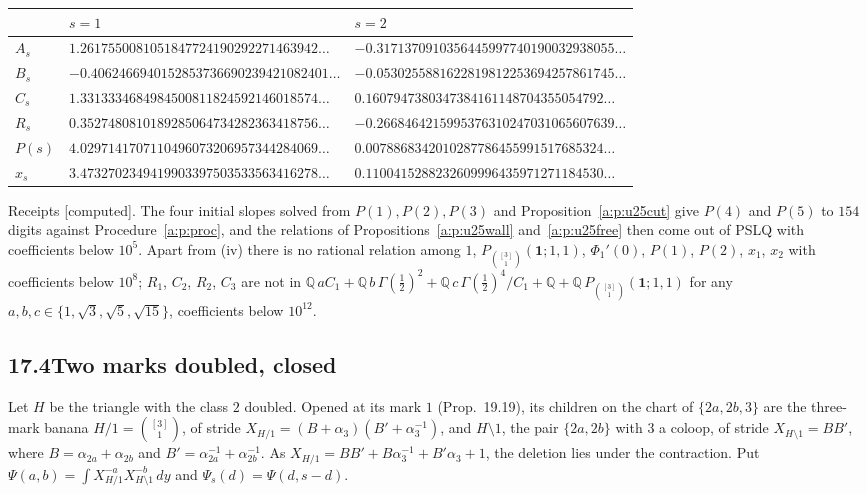 \documentclass[11pt]{article}
\newcommand{\one}{\mathbf 1}
\newcommand{\Pth}{P_{\binom{[3]}1}(\one;1,1)}
\theoremstyle{plain}
\theoremstyle{definition}
\theoremstyle{remark}
\newcommand{\computed}{\textup{[computed]}}
\begin{document}
\begin{center}
\small
\begin{tabular}{@{}l l l@{}}
\toprule
& $s=1$ & $s=2$\\ \midrule
$A_s$ & $1.2617550081051847724190292271463942\ldots$ & $-0.3171370910356445997740190032938055\ldots$\\
$B_s$ & $-0.4062466940152853736690239421082401\ldots$ & $-0.0530255881622819812253694257861745\ldots$\\
$C_s$ & $1.3313334684984500811824592146018574\ldots$ & $0.1607947380347384161148704355054792\ldots$\\
$R_s$ & $0.3527480810189285064734282363418756\ldots$ & $-0.2668464215995376310247031065607639\ldots$\\
$P(s)$ & $4.0297141707110496073206957344284069\ldots$ & $0.0078868342010287786455991517685324\ldots$\\
$x_s$ & $3.4732702349419903397503533563416278\ldots$ & $0.1100415288232609996435971271184530\ldots$\\
\bottomrule
\end{tabular}
\end{center}

\noindent Receipts \computed. The four initial slopes solved from $P(1),P(2),P(3)$ and Proposition~\ref{a:p:u25cut} give $P(4)$ and $P(5)$ to $154$ digits against Procedure~\ref{a:p:proc}, and the relations of Propositions~\ref{a:p:u25wall} and~\ref{a:p:u25free} then come out of PSLQ with coefficients below $10^5$. Apart from (iv) there is no rational relation among $1$, $\Pth$, $\Phi_1'(0)$, $P(1)$, $P(2)$, $x_1$, $x_2$ with coefficients below $10^8$; $R_1$, $C_2$, $R_2$, $C_3$ are not in $\mathbb Q\,aC_1+\mathbb Q\,b\,\Gamma(\frac12)^2+\mathbb Q\,c\,\Gamma(\frac12)^4/C_1+\mathbb Q+\mathbb Q\,\Pth$ for any $a,b,c\in\{1,\sqrt3,\sqrt5,\sqrt{15}\}$, coefficients below $10^{12}$.

\subsection*{17.4\quad Two marks doubled, closed}

Let $H$ be the triangle with the class $2$ doubled. Opened at its mark $1$ (Prop.~19.19), its children on the chart of $\{2a,2b,3\}$ are the three-mark banana $H/1=\binom{[3]}1$, of stride $X_{H/1}=(B+\alpha_3)(B'+\alpha_3^{-1})$, and $H\setminus1$, the pair $\{2a,2b\}$ with $3$ a coloop, of stride $X_{H\setminus1}=BB'$, where $B=\alpha_{2a}+\alpha_{2b}$ and $B'=\alpha_{2a}^{-1}+\alpha_{2b}^{-1}$. As $X_{H/1}=BB'+B\alpha_3^{-1}+B'\alpha_3+1$, the deletion lies under the contraction. Put $\Psi(a,b)=\int X_{H/1}^{-a}X_{H\setminus1}^{-b}\,dy$ and $\Psi_s(d)=\Psi(d,s-d)$.
\end{document}
